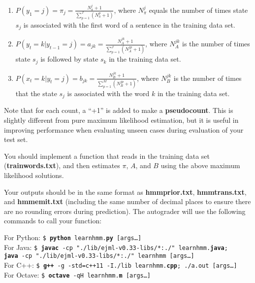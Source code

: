 \documentclass{article}
\begin{document}
\begin{enumerate}
    \item $P(y_1 = j) = \pi_j = \frac{N_\pi^j+1}{\sum_{p=1}^{J}(N_\pi^p+1)}$, where $N_\pi^j$ equals the number of times state $s_j$ is associated with the first word of a sentence in the training data set.
    \item $P(y_{t} = k\vert y_{t-1}=j) = a_{jk}= \frac{N_A^{jk}+1}{\sum_{p=1}^J (N_A^{jp}+1)}$, where $N_A^{jk}$ is the number of times state $s_j$ is followed by state $s_k$ in the training data set.  
    \item $P(x_{t} = k\vert y_{t}=j) = b_{jk}= \frac{N_B^{jk}+1}{\sum_{p=1}^M (N_B^{jp}+1)}$, where $N_B^{jk}$ is the number of times that the state $s_j$ is associated with the word $k$ in the training data set.
\end{enumerate}

Note that for each count, a ``+1'' is added to make a \textbf{pseudocount}. This is slightly different from pure maximum likelihood estimation, but it is useful in improving performance when evaluating unseen cases during evaluation of your test set.

You should implement a function that reads in the training data set (\textbf{trainwords.txt}), and then estimates $\pi$, $A$, and $B$ using the above maximum likelihood solutions. 

Your outputs should be in the same format as \textbf{hmmprior.txt}, \textbf{hmmtrans.txt}, and \textbf{hmmemit.txt} (including the same number of decimal places to ensure there are no rounding errors during prediction). The autograder will use the following commands to call your function:

\begin{tabbing}
For Python: \=\texttt{\$ \textbf{python} learnhmm.\textbf{py} [args\dots]}\\
For Java: \>\texttt{\$ \textbf{javac} -cp "./lib/ejml-v0.33-libs/*:./" learnhmm.\textbf{java};\\ \>  \texttt{\textbf{java} -cp "./lib/ejml-v0.33-libs/*:./" learnhmm [args\dots]}}\\
For C++: \>\texttt{\$ \textbf{g++} -g -std=c++11 -I./lib learnhmm.\textbf{cpp}; ./a.out [args\dots]}\\
For Octave: \>\texttt{\$ \textbf{octave} -qH learnhmm.\textbf{m} [args\dots]}
\end{tabbing}
\end{document}
